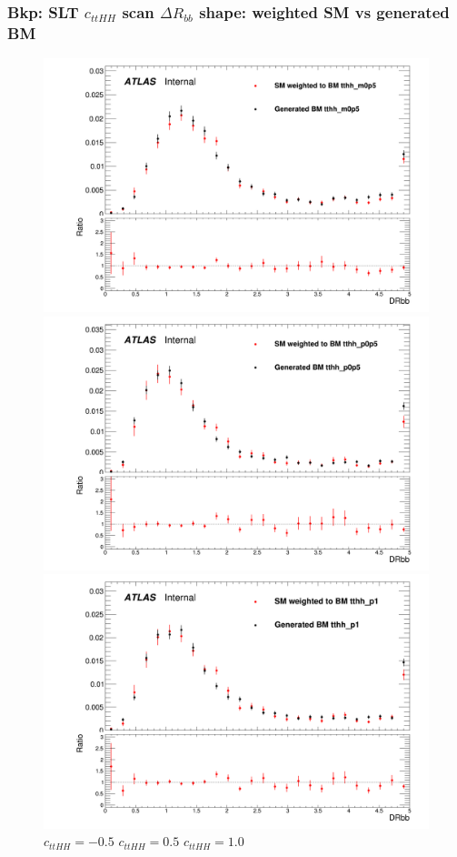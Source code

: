 \documentclass[twoside,11pt]{beamer}
\begin{document}
\begin{frame}
    \frametitle{Bkp: SLT $c_{ttHH}$ scan $\Delta R_{bb}$ shape: weighted SM vs generated BM}
\begin{figure}
    \includegraphics[width=.32\textwidth]{figures/Method_B_all_latest/BMtthh_m0p5h_DRbb.png}
    \includegraphics[width=.32\textwidth]{figures/Method_B_all_latest/BMtthh_p0p5h_DRbb.png}
    \includegraphics[width=.32\textwidth]{figures/Method_B_all_latest/BMtthh_p1h_DRbb.png}
    $c_{ttHH} = -0.5$ \hspace{5em} $c_{ttHH} = 0.5$\hspace{5em} $c_{ttHH} = 1.0$    
\end{figure}

\end{frame}   
\end{document}

